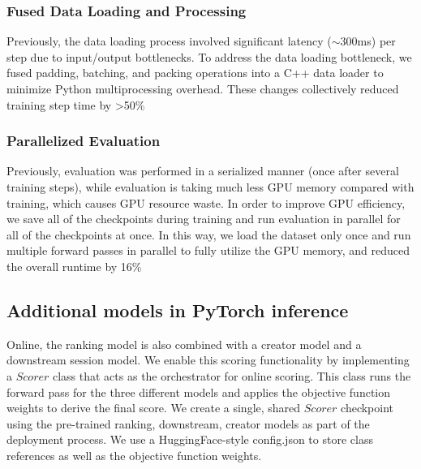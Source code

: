 \documentclass[sigconf]{acmart}
\begin{document}
\subsubsection{Fused Data Loading and Processing}
Previously, the data loading process involved significant latency ($\sim300$ms) per step due to input/output bottlenecks. To address the data loading bottleneck, we fused padding, batching, and packing operations into a C++ data loader to minimize Python multiprocessing overhead. These changes collectively reduced training step time by >50\%

\subsubsection{Parallelized Evaluation}
Previously, evaluation was performed in a serialized manner (once after several training steps), while evaluation is taking much less GPU memory compared with training, which causes GPU resource waste. In order to improve GPU efficiency, we save all of the checkpoints during training and run evaluation in parallel for all of the checkpoints at once. In this way, we load the dataset only once and run multiple forward passes in parallel to fully utilize the GPU memory, and reduced the overall runtime by 16\%

\subsection{Additional models in PyTorch inference}
Online, the ranking model is also combined with a creator model and a downstream session model.  We enable this scoring functionality by implementing a $Scorer$ class that acts as the orchestrator for online scoring. This class runs the forward pass for the three different models and applies the objective function weights to derive the final score. We create a single, shared $Scorer$ checkpoint using the pre-trained ranking, downstream, creator models as part of the deployment process. We use a HuggingFace-style config.json to store class references as well as the objective function weights.
\end{document}
